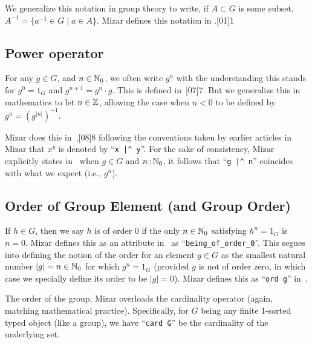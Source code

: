 \begin{notation}
We generalize this notation in group theory to write, if $A\subset G$ is
some subset, $A^{-1}=\{a^{-1}\in G\mid a\in A\}$. Mizar defines this
notation in .[01]{1}
\end{notation}

\subsection{Power operator}
For any $g\in G$, and $n\in\mathbb{N}_{0}$, we often write $g^{n}$ with the
understanding this stands for $g^{0}=1_{G}$ and $g^{n+1}=g^{n}\cdot g$.
This is defined in~[07]{7}. But we generalize this in
mathematics to let $n\in\mathbb{Z}$, allowing the case when $n<0$ to be defined
by $g^{n} = (g^{|n|})^{-1}$.

Mizar does this in~,[08]{8}
following the conventions taken by earlier articles in Mizar that
$x^{y}$ is denoted by ``\verb#x |^ y#''.
For the sake of consistency, Mizar explicitly states in~
when $g\in G$ and $n\mathop{:}\nolimits \mathbb{N}_{0}$, it follows
that ``\verb#g |^ n#'' coincides with what we expect (i.e., $g^{n}$).

\subsection{Order of Group Element (and Group Order)}
If $h\in G$, then we say $h$ is of order 0 if the only $n\in\mathbb{N}_{0}$
satisfying $h^{n}=1_{G}$ is $n=0$. Mizar defines this as an attribute
in~ as ``\verb#being_of_order_0#''.
This segues into defining the notion of the order for an element $g\in G$
as the smallest natural number $|g|=n\in\mathbb{N}_{0}$ for which $g^{n}=1_{G}$
(provided $g$ is not of order zero, in which case we specially define
its order to be $|g|=0$). Mizar defines this as
``\verb#ord g#''
in~.

The order of the group, Mizar overloads the cardinality operator (again,
matching mathematical practice). Specifically,
for $G$ being any finite 1-sorted typed object (like a group), we have
``\verb#card G#'' be the cardinality
of the underlying set.

